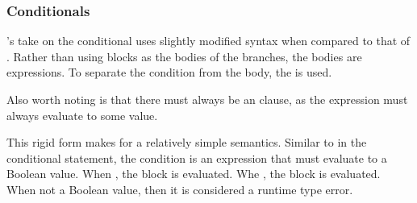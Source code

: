 \subsubsection{Conditionals}

\Poetry{}'s take on the conditional uses slightly modified syntax when
compared to that of \Prose{}. Rather than using blocks as the bodies of
the branches, the bodies are expressions. To separate the condition from
the body, the  is used.

Also worth noting is that there must always be an  clause, as
the expression must always evaluate to some value.

\begin{bnf*}
\end{bnf*}

This rigid form makes for a relatively simple semantics. Similar to in the
conditional statement, the condition is an expression that must evaluate
to a Boolean value. When , the  block is evaluated.
Whe , the  block is evaluated. When not a Boolean value,
then it is considered a runtime type error.

\begin{prooftree}
\end{prooftree}

\begin{prooftree}
\end{prooftree}
